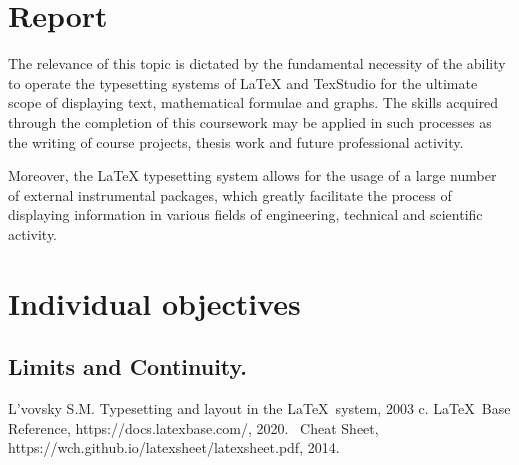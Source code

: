\documentclass[12pt]{article}
\begin{document}
\newpage
\section{Report}
The relevance of this topic is dictated by the fundamental necessity of the ability to operate the typesetting systems of \LaTeX {} and TexStudio for the ultimate scope of displaying text, mathematical formulae and graphs. The skills acquired through the completion of this coursework may be applied in such processes as the writing of course projects, thesis work and future professional activity.

Moreover, the \LaTeX {} typesetting system allows for the usage of a large number of external instrumental packages, which greatly facilitate the process of displaying information in various fields of engineering, technical and scientific activity.
\newpage
\section{Individual objectives}

\subsection{Limits and Continuity.}


\newpage
{}
\begin{thebibliography}{3}
 L'vovsky S.M. Typesetting and layout in the \LaTeX\ system, 2003 c.
 \LaTeX\ Base Reference, https://docs.latexbase.com/, 2020.
 \LaTeXe\ Cheat Sheet, https://wch.github.io/latexsheet/latexsheet.pdf, 2014.
\end{thebibliography}
\end{document}
